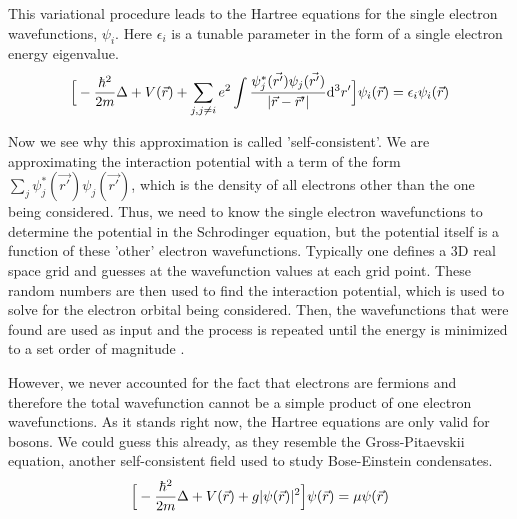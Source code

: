 \documentclass[notitlepage,letter,preprint,prb]{revtex4}
\begin{document}
	This variational procedure leads to the Hartree equations for the single electron wavefunctions, $\psi_i$.  Here $\epsilon_i$ is a tunable parameter in the form of a single electron energy eigenvalue.  
	\begin{equation}
	\Big{[}-\frac{\hbar^2}{2m}\Delta + V(\vec{r}) + \sum_{j,j\ne i}e^{2}\int\frac{\psi^{*}_j(\vec{r'})\psi_j(\vec{r'})}{|\vec{r}-\vec{r}'|}\mathrm{d}^{3}r'\Big{]}\psi_i(\vec{r}) = \epsilon_i\psi_i(\vec{r})
	\nonumber
	\end{equation}

	Now we see why this approximation is called 'self-consistent'.  We are approximating the interaction potential with a term of the form $\sum_{j}\psi^{*}_j(\vec{r'})\psi_j(\vec{r'})$, which is the density of all electrons other than the one being considered.  Thus, we need to know the single electron wavefunctions to determine the potential in the Schrodinger equation, but the potential itself is a function of these 'other' electron wavefunctions.  Typically one defines a 3D real space grid and guesses at the wavefunction values at each grid point.  These random numbers are then used to find the interaction potential, which is used to solve for the electron orbital being considered.  Then, the wavefunctions that were found are used as input and the process is repeated until the energy is minimized to a set order of magnitude \citealp{electronic}.  
	
	However, we never accounted for the fact that electrons are fermions and therefore the total wavefunction cannot be a simple product of one electron wavefunctions.  As it stands right now, the Hartree equations are only valid for bosons.  We could guess this already, as they resemble the Gross-Pitaevskii equation, another self-consistent field used to study Bose-Einstein condensates.  
	\begin{equation}
	\Big{[}-\frac{\hbar^2}{2m}\Delta + V(\vec{r}) + g|\psi(\vec{r})|^2\Big{]}\psi(\vec{r}) = \mu\psi(\vec{r})
	\nonumber
	\end{equation}
	
\end{document}
